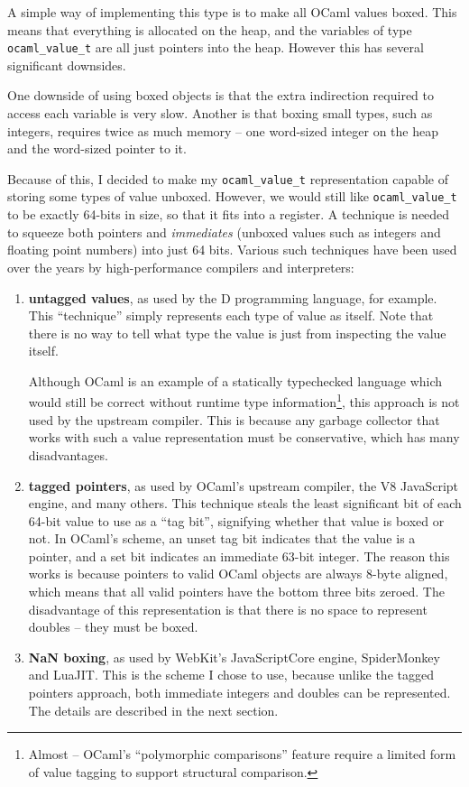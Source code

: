 \documentclass[12pt,a4paper,twoside,openright]{report}
\begin{document}
A simple way of implementing this type is to make all OCaml values boxed. This means
that everything is allocated on the heap, and the variables of type
\lstinline!ocaml_value_t! are all just pointers into the heap. However this has
several significant downsides.

One downside of using boxed objects is that the extra indirection required to
access each variable is very slow. Another is that boxing small types, such as
integers, requires twice as much memory -- one word-sized integer on the heap
and the word-sized pointer to it.

Because of this, I decided to make my \lstinline!ocaml_value_t! representation
capable of storing some types of value unboxed. However, we would still like
\lstinline!ocaml_value_t! to be exactly 64-bits in size, so that it fits into a
register. A technique is needed to squeeze both pointers and \textit{immediates}
(unboxed values such as integers and floating point numbers) into just 64 bits.
Various such techniques have been used over the years by high-performance
compilers and interpreters:
\begin{enumerate}
  \item \textbf{untagged values}, as used by the D programming language, for
    example. This ``technique'' simply represents each type of value as itself.
    Note that there is no way to tell what type the value is just from inspecting the value itself.

    Although OCaml is an example of a statically typechecked language which would
    still be correct without runtime type information\footnote{Almost -- OCaml's
    ``polymorphic comparisons'' feature require a limited form of value tagging
    to support structural comparison.}, this approach is not used by the upstream
    compiler. This is because any garbage collector that works with such a
    value representation must be conservative, which has many
    disadvantages.
  \item \textbf{tagged pointers}, as used by OCaml's upstream compiler, the V8
    JavaScript engine, and many others. This technique steals the least
    significant bit of each 64-bit value to use as a ``tag bit'', signifying whether
    that value is boxed or not. In OCaml's scheme, an unset tag bit indicates
    that the value is a pointer, and a set bit indicates an immediate 63-bit integer.
    The reason this works is because pointers to valid OCaml objects are always
    8-byte aligned, which means that all valid pointers have the bottom
    three bits zeroed. The disadvantage of this representation is that there is
    no space to represent doubles -- they must be boxed.
  \item \textbf{NaN boxing}, as used by WebKit's JavaScriptCore engine,
    SpiderMonkey and LuaJIT. This is the scheme I chose to use, because unlike
    the tagged pointers approach, both immediate integers and doubles can be
    represented. The details are described in the next section.
\end{enumerate}
\end{document}
